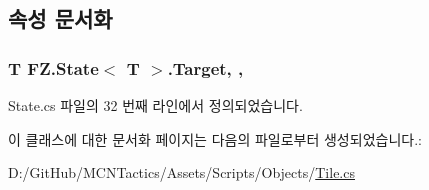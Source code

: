 \subsection{속성 문서화}
\subsubsection[{\texorpdfstring{Target}{Target}}]{\setlength{\rightskip}{0pt plus 5cm}T {\bf F\+Z.\+State}$<$ T $>$.Target\hspace{0.3cm}{\ttfamily [get]}, {\ttfamily [protected]}, {\ttfamily [inherited]}}\hypertarget{class_f_z_1_1_state_a6927f5c9f2517052f9dc5596188e9d95}{}\label{class_f_z_1_1_state_a6927f5c9f2517052f9dc5596188e9d95}


State.\+cs 파일의 32 번째 라인에서 정의되었습니다.



이 클래스에 대한 문서화 페이지는 다음의 파일로부터 생성되었습니다.\+:\begin{DoxyCompactItemize}
\item 
D\+:/\+Git\+Hub/\+M\+C\+N\+Tactics/\+Assets/\+Scripts/\+Objects/\hyperlink{_tile_8cs}{Tile.\+cs}\end{DoxyCompactItemize}
